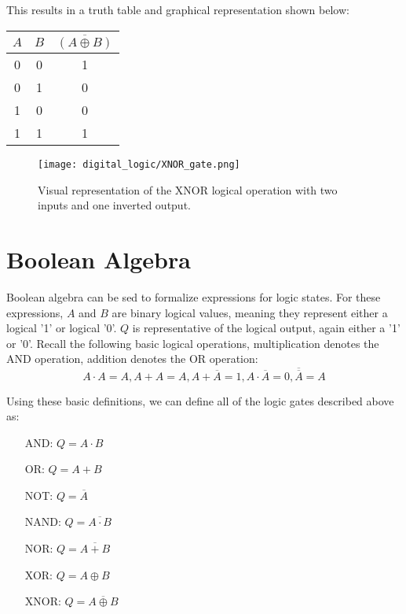     This results in a truth table and graphical representation shown below:
    \begin{table}[h!]
        \begin{tabular}{c c | c}
            \toprule
            $A$ & $B$ & $\overline{(A \oplus B)}$  \\
            \midrule
             0  &  0  &    1    \\
             0  &  1  &    0    \\
             1  &  0  &    0    \\
             1  &  1  &    1    \\
            \bottomrule
        \end{tabular}
    \end{table}

    \begin{figure}[h!]
        \texttt{[image: digital\_logic/XNOR\_gate.png]}
        \caption[XNOR Gate]{Visual representation of the XNOR logical operation with two inputs and one inverted output.}
    \end{figure}

\section{Boolean Algebra}
Boolean algebra can be sed to formalize expressions for logic states.
For these expressions, $A$ and $B$ are binary logical values, meaning they represent either a logical '1' or logical '0'.
$Q$ is representative of the logical output, again either a '1' or '0'.
Recall the following basic logical operations, multiplication denotes the AND operation, addition denotes the OR operation:
\begin{equation*}
    A \cdot A = A, A + A = A, A + \overline{A} = 1, A \cdot \overline{A} = 0, \overline{\overline{A}} = A
\end{equation*}

Using these basic definitions, we can define all of the logic gates described above as:

\begin{itemize}
    \item [AND: ]{$Q = A \cdot B$}
    \item [OR: ]{$Q = A + B$}
    \item [NOT: ]{$Q = \overline{A}$}
    \item [NAND: ]{$Q = \overline{A \cdot B}$}
    \item [NOR: ]{$Q = \overline{A + B}$}
    \item [XOR: ]{$Q = A \oplus B$}
    \item [XNOR:]{$Q = \overline{A \oplus B}$}
\end{itemize}

